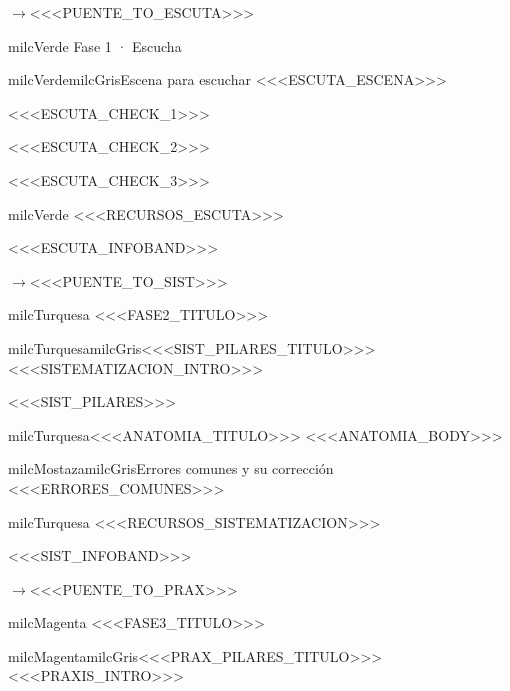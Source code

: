 \documentclass[11pt,letterpaper]{article}
\newcommand{\puente}[1]{%
  \begin{puentebox}%
    \textcolor{milcGradeDark}{$\rightarrow$}\hspace{2mm}#1%
  \end{puentebox}%
}
\begin{document}
\puente{<<<PUENTE_TO_ESCUTA>>>}

\begin{titlebox}{milcVerde}
Fase 1 · Escucha
\end{titlebox}

\begin{softbox}{milcVerde}{milcGris}{Escena para escuchar}
<<<ESCUTA_ESCENA>>>
\end{softbox}

\begin{checklista}
\item <<<ESCUTA_CHECK_1>>>
\item <<<ESCUTA_CHECK_2>>>
\item <<<ESCUTA_CHECK_3>>>
\end{checklista}

\begin{infoband}{milcVerde}
<<<RECURSOS_ESCUTA>>>

<<<ESCUTA_INFOBAND>>>
\end{infoband}

\puente{<<<PUENTE_TO_SIST>>>}

\begin{titlebox}{milcTurquesa}
<<<FASE2_TITULO>>>
\end{titlebox}

\begin{softbox}{milcTurquesa}{milcGris}{<<<SIST_PILARES_TITULO>>>}
<<<SISTEMATIZACION_INTRO>>>
\end{softbox}

<<<SIST_PILARES>>>

\begin{drawbox}{milcTurquesa}{<<<ANATOMIA_TITULO>>>}
<<<ANATOMIA_BODY>>>
\end{drawbox}

\begin{softbox}{milcMostaza}{milcGris}{Errores comunes y su corrección}
<<<ERRORES_COMUNES>>>
\end{softbox}

\begin{infoband}{milcTurquesa}
<<<RECURSOS_SISTEMATIZACION>>>

<<<SIST_INFOBAND>>>
\end{infoband}

\puente{<<<PUENTE_TO_PRAX>>>}

\begin{titlebox}{milcMagenta}
<<<FASE3_TITULO>>>
\end{titlebox}

\begin{softbox}{milcMagenta}{milcGris}{<<<PRAX_PILARES_TITULO>>>}
<<<PRAXIS_INTRO>>>
\end{softbox}
\end{document}
